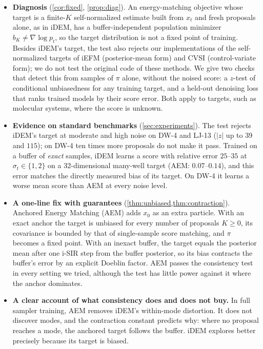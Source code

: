\begin{itemize}
\item \textbf{Diagnosis} (\cref{cor:fixed}, \cref{prop:diag}). An energy-matching objective whose target is a finite-$K$ self-normalized estimate built from $x_t$ and fresh proposals alone, as in iDEM, has a buffer-independent population minimizer $b_K\neq\nabla\log p_t$, so the target distribution is not a fixed point of training. Besides iDEM's target, the test also rejects our implementations of the self-normalized targets of iEFM (posterior-mean form) and CVSI (control-variate form); we do not test the original code of these methods. We give two checks that detect this from samples of $\pi$ alone, without the noised score: a $z$-test of conditional unbiasedness for any training target, and a held-out denoising loss that ranks trained models by their score error. Both apply to targets, such as molecular systems, where the score is unknown.
\item \textbf{Evidence on standard benchmarks} (\cref{sec:experiments}). The test rejects iDEM's target at moderate and high noise on DW-4 and LJ-13 ($|z|$ up to $39$ and $115$); on DW-4 ten times more proposals do not make it pass. Trained on a buffer of \emph{exact} samples, iDEM learns a score with relative error $25$--$35$ at $\sigma_t\in\{1,2\}$ on a 32-dimensional many-well target (AEM: $0.07$--$0.14$), and this error matches the directly measured bias of its target. On DW-4 it learns a worse mean score than AEM at every noise level.
\item \textbf{A one-line fix with guarantees} (\cref{thm:unbiased,thm:contraction}). Anchored Energy Matching (AEM) adds $x_0$ as an extra particle. With an exact anchor the target is unbiased for every number of proposals $K\ge0$, its covariance is bounded by that of single-sample score matching, and $\pi$ becomes a fixed point. With an inexact buffer, the target equals the posterior mean after one i-SIR step from the buffer posterior, so its bias contracts the buffer's error by an explicit Doeblin factor. AEM passes the consistency test in every setting we tried, although the test has little power against it where the anchor dominates.
\item \textbf{A clear account of what consistency does and does not buy.} In full sampler training, AEM removes iDEM's within-mode distortion. It does not discover modes, and the contraction constant predicts why: where no proposal reaches a mode, the anchored target follows the buffer. iDEM explores better precisely because its target is biased.
\end{itemize}

